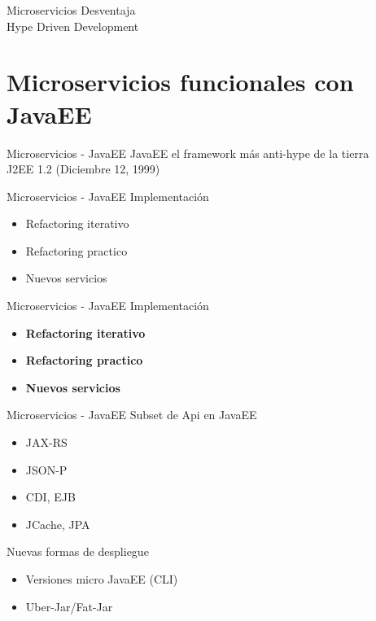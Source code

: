 \documentclass{beamer}
\begin{document}
\begin{frame}{Microservicios}
Desventaja \\

\huge Hype Driven Development
\end{frame}

\section{Microservicios funcionales con JavaEE}
\begin{frame}{Microservicios - JavaEE}
JavaEE el framework más anti-hype de la tierra\\

\huge J2EE 1.2 (Diciembre 12, 1999)
\end{frame}


\begin{frame}{Microservicios - JavaEE}
Implementación
\begin{itemize}
	\item Refactoring iterativo
	\item Refactoring practico
	\item Nuevos servicios
\end{itemize}
\end{frame}

\begin{frame}{Microservicios - JavaEE}
Implementación
\begin{itemize}
	\item \textbf{Refactoring iterativo}
	\item \textbf{Refactoring practico}
	\item \textbf{Nuevos servicios}
\end{itemize}
\end{frame}

\begin{frame}{Microservicios - JavaEE}
Subset de Api en JavaEE
\begin{itemize}
	\item JAX-RS
	\item JSON-P
	\item CDI, EJB
	\item JCache, JPA
\end{itemize}

Nuevas formas de despliegue
\begin{itemize}
	\item Versiones micro JavaEE (CLI)
	\item Uber-Jar/Fat-Jar
\end{itemize}
\end{frame}
\end{document}
